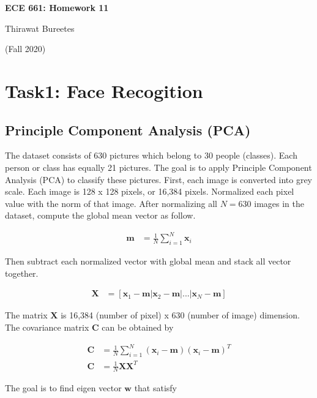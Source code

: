 \documentclass[11pt]{article}
\begin{document}
\begin{center}
\Large{\textbf{ECE 661: Homework 11}}

Thirawat Bureetes

(Fall 2020)
\end{center}
	
 

\section*{Task1: Face Recogition}

\subsection*{Principle Component Analysis (PCA)}

The dataset consists of 630 pictures which belong to 30 people (classes). Each person or class has equally 21 pictures. The goal is to apply Principle Component Analysis (PCA) to classify these pictures. First, each image is converted into grey scale. Each image is 128 x 128 pixels, or 16,384 pixels. Normalized each pixel value with the norm of that image. After normalizing all $N=630$ images in the dataset, compute the global mean vector as follow.

\begin{align*}
\mathbf{m} &= \frac{1}{N} \sum_{i=1}^{N} \mathbf{x}_i
\end{align*}

Then subtract each normalized vector with global mean and stack all vector together. 

\begin{align*}
\mathbf{X} &= [\mathbf{x}_1 - \mathbf{m} | \mathbf{x}_2 - \mathbf{m} | ... | \mathbf{x}_N - \mathbf{m}]
\end{align*}

The matrix $\mathbf{X}$ is 16,384 (number of pixel) x 630 (number of image) dimension. The covariance matrix $\mathbf{C}$ can be obtained by 

\begin{align*}
\mathbf{C} &= \frac{1}{N} \sum_{i=1}^{N} (\mathbf{x}_i - \mathbf{m}) (\mathbf{x}_i - \mathbf{m})^T \\
\mathbf{C} &= \frac{1}{N} \mathbf{X}\mathbf{X}^T
\end{align*}

The goal is to find eigen vector $\mathbf{w}$ that satisfy
\end{document}
